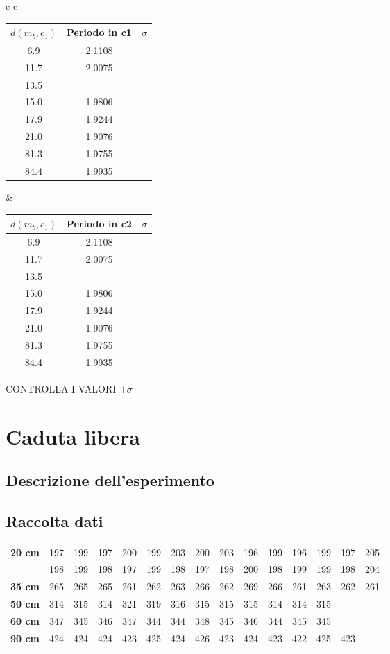 \documentclass[a4paper,10pt]{report}
\begin{document}
\begin{center}
\begin{tabular}{c   c}
\begin{tabular}{|c|c|c|}
$d(m_b,c_1)$ & Periodo in c1 & $\sigma$ \\
\midrule
6.9 & 2.1108 &\\
11.7 & 2.0075 &\\
13.5 & &\\
15.0 &  1.9806 &\\
17.9 & 1.9244 &\\
21.0 & 1.9076 &\\
81.3 & 1.9755&\\
84.4 & 1.9935&\\
\end{tabular}
&
\begin{tabular}{|c|c|c|}
$d(m_b,c_1)$ & Periodo in c2 & $\sigma$ \\
\midrule
6.9 & 2.1108 &\\
11.7 & 2.0075 &\\
13.5 & &\\
15.0 &  1.9806 &\\
17.9 & 1.9244 &\\
21.0 & 1.9076 &\\
81.3 & 1.9755&\\
84.4 & 1.9935&\\
\end{tabular}
\end{tabular}
\end{center}
CONTROLLA I VALORI
$\pm\sigma$

\section{Caduta libera}

\subsection{Descrizione dell'esperimento}

\subsection{Raccolta dati}
\begin{center}
\begin{tabular}{r|*{14}{c}}
\textbf{20 cm} & 197 & 199 & 197 & 200 & 199 & 203 & 200 & 203 & 196 & 199 & 196 & 199 & 197 & 205\\
& 198 & 199 & 198 & 197 & 199 & 198 & 197 & 198 & 200 & 198 & 199 & 199 & 198 & 204\\
\midrule
\textbf{35 cm} & 265 & 265 & 265 & 261 & 262 & 263 & 266 & 262 & 269 & 266 & 261 & 263 & 262 & 261\\
\midrule
\textbf{50 cm} & 314 & 315 & 314 & 321 & 319 & 316 & 315 & 315 & 315 & 314 & 314 & 315\\
\midrule
\textbf{60 cm} & 347 & 345 & 346 & 347 & 344 & 344 & 348 & 345 & 346 & 344 & 345 & 345\\
\midrule
\textbf{90 cm} & 424& 424& 424& 423& 425& 424& 426& 423& 424& 423& 422& 425& 423\\
\end{tabular}
\end{center}
\end{document}
